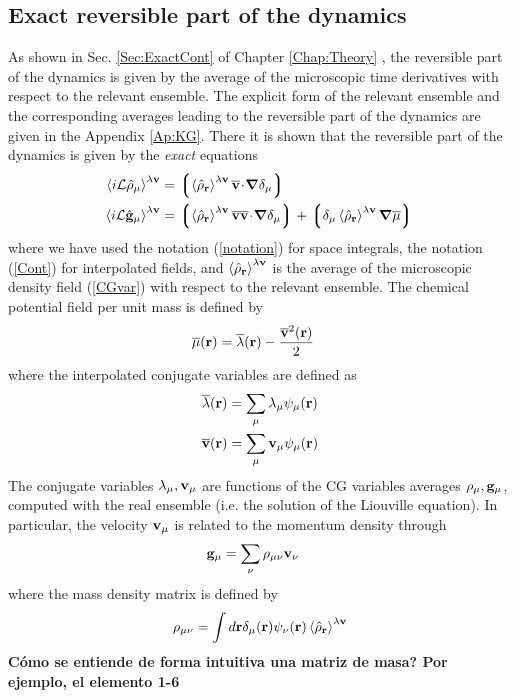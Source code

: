 \documentclass[b5paper,openright,11pt]{book}
\newcommand{\esc}{\!\cdot\!}
\newcommand{\Note}[1]{{\bf \color{red}#1}}    %
\newcommand{\llangle}{\left\langle}
\newcommand{\rrangle}{\right\rangle}
\newcommand{\llg}{\left\lgroup}
\newcommand{\rlg}{\right\rgroup}
\begin{document}
\subsection{Exact reversible part of the dynamics}
As shown in Sec. \ref{Sec:ExactCont} of Chapter \ref{Chap:Theory} , the reversible part
of  the dynamics  is  given by  the average  of  the microscopic  time
derivatives with respect to the  relevant ensemble.  The explicit form
of the relevant ensemble and the corresponding averages leading to the
reversible  part   of  the   dynamics  are   given  in   the  Appendix
\ref{Ap:KG}.  There  it is  shown  that  the  reversible part  of  the
dynamics is given by the \textit{exact} equations
\begin{align}
  \llangle i{\cal L}\hat{\rho}_\mu\rrangle^{\lambda{\bf v}} &=
  \llg\llangle \hat{\rho}_{\bf r}\rrangle^{\lambda{\bf v}}
\overline{\bf v}\esc\boldsymbol{\nabla}\delta_{\mu}\rlg
\nonumber\\
  \llangle i{\cal L}\hat{\bf g}_\mu\rrangle^{\lambda{\bf v}} &=
\llg\llangle \hat{\rho}_{\bf r}\rrangle^{\lambda{\bf v}}
\overline{\bf v}\overline{\bf v}\esc\boldsymbol{\nabla}\delta_{\mu}\rlg
+\llg\delta_\mu\llangle\hat{\rho}_{\bf r}\rrangle^{\lambda{\bf v}}\boldsymbol{\nabla}\overline{\mu}\rlg
\label{ExactRev}
\end{align}
where we have used the  notation (\ref{notation}) for space integrals,
the  notation  (\ref{Cont})  for interpolated  fields,  and  $\llangle
\hat{\rho}_{\bf  r}\rrangle^{\lambda{\bf v}}$  is the  average of  the
microscopic  density field  (\ref{CGvar})  with  respect to  the
relevant  ensemble.  The  chemical potential  field per  unit mass  is
defined by
\begin{align}
  \overline{\mu}({\bf r})&=\overline{\lambda}({\bf r})-\frac{\overline{\bf v}^2({\bf r})}{2}
\end{align}
where the interpolated conjugate variables are defined as 
\begin{align}
  \overline{\lambda}({\bf r})&=\sum_{\mu}{\lambda}_{\mu}\psi_\mu({\bf r})
\nonumber\\
\overline{\bf v}({\bf r})&=\sum_{\mu}{\bf v}_{\mu}\psi_\mu({\bf r})
\end{align}
The conjugate variables $\lambda_\mu,{\bf v}_\mu$ are functions of the
CG variables averages $\rho_\mu,{\bf g}_\mu$, computed with the real ensemble (i.e. the solution of the Liouville equation). In particular, the velocity ${\bf
v}_\mu$ is related to the momentum density through
\begin{align}
  {\bf g}_\mu&=\sum_{\nu}\rho_{\mu\nu}{\bf v}_\nu
\label{vnu}
\end{align}
where  the mass density matrix is defined by
\begin{align}
  \rho_{\mu\nu} =\int d{\bf r}
\delta_\mu({\bf r})\psi_\nu({\bf r})\llangle\hat{\rho}_{\bf r}\rrangle^{\lambda{\bf v}}
\label{rhomunu}
\end{align}
\Note{Cómo se entiende de forma intuitiva una matriz de masa? Por ejemplo, el elemento 1-6}
\end{document}
